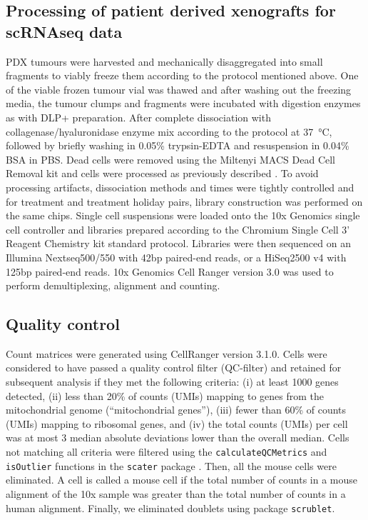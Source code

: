 \subsection{Processing of patient derived xenografts for scRNAseq data}
PDX tumours were harvested and mechanically disaggregated into small fragments to viably freeze them according to the protocol mentioned above. 
One of the viable frozen tumour vial was thawed and after washing out the freezing media, the tumour clumps and fragments were incubated with digestion enzymes as with DLP+ preparation. After complete dissociation with collagenase/hyaluronidase enzyme mix according to the protocol at \SI{37}{\degreeCelsius}, followed by briefly washing in 0.05\% trypsin-EDTA and resuspension in 0.04\% BSA in PBS. Dead cells were removed using the Miltenyi MACS Dead Cell Removal kit and cells were processed as previously described \cite{o2019dissociation}.
To avoid processing artifacts, dissociation methods and times were tightly controlled and for treatment and treatment holiday pairs, library construction was performed on the same chips. Single cell suspensions were loaded onto the 10x Genomics single cell controller and libraries prepared according to the Chromium Single Cell 3’ Reagent Chemistry kit standard protocol. 
Libraries were then sequenced on an Illumina Nextseq500/550 with 42bp paired-end reads, or a HiSeq2500 v4 with 125bp paired-end reads. 10x Genomics Cell Ranger version 3.0 was used to perform demultiplexing, alignment and counting.

\subsection{Quality control}

Count matrices were generated using CellRanger version 3.1.0. Cells were considered to have passed a quality control filter (QC-filter) and retained for subsequent analysis if they met the following criteria: (i) at least 1000 genes detected, (ii) less than 20\% of counts (UMIs) mapping to genes from the mitochondrial genome (``mitochondrial genes''), (iii) fewer than 60\% of counts (UMIs) mapping to ribosomal genes, and (iv) the total counts (UMIs) per cell was at most 3 median absolute deviations lower than the overall median. Cells not matching all criteria were filtered using the \texttt{calculateQCMetrics} and \texttt{isOutlier} functions in the \texttt{scater} package \cite{mccarthy2017scater}. Then, all the mouse cells were eliminated. A cell is called a mouse cell if the total number of counts in a mouse alignment of the 10x sample was greater than the total number of counts in a human alignment. Finally, we eliminated doublets using package \texttt{scrublet}\cite{scrublet}.

